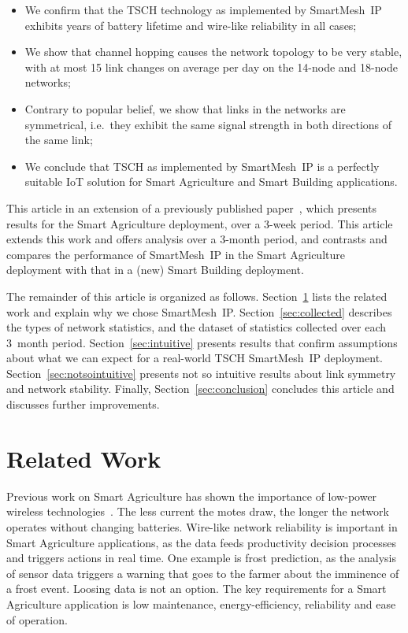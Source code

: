 \documentclass{elsarticle}
\newcommand{\smip}                {SmartMesh~IP\xspace}
\newcommand{\building}            {Smart Building\xspace}
\newcommand{\agri}                {Smart Agriculture\xspace}
\begin{document}
\begin{itemize}
    \item We confirm that the TSCH technology as implemented by \smip exhibits years of battery lifetime and wire-like reliability in all cases;
    \item We show that channel hopping causes the network topology to be very stable, with at most 15 link changes on average per day on the 14-node and 18-node networks;
    \item Contrary to popular belief, we show that links in the networks are symmetrical, i.e.~they exhibit the same signal strength in both directions of the same link;
    \item We conclude that TSCH as implemented by \smip is a perfectly suitable IoT solution for \agri and \building applications.
\end{itemize}


This article in an extension of a previously published paper~\cite{brun16intuitive}, which presents results for the \agri deployment, over a 3-week period.
This article extends this work and offers analysis over a 3-month period, and contrasts and compares the performance of \smip in the \agri deployment with that in a (new) \building deployment.


The remainder of this article is organized as follows.
Section~\ref{sec:related} lists the related work and explain why we chose \smip.
Section~\ref{sec:collected} describes the types of network statistics, and the dataset of statistics collected over each 3~month period.
Section~\ref{sec:intuitive} presents results that confirm assumptions about what we can expect for a real-world TSCH \smip deployment.
Section~\ref{sec:notsointuitive} presents not so intuitive results about link symmetry and network stability.
Finally, Section~\ref{sec:conclusion} concludes this article and discusses further improvements.

\section{Related Work}
\label{sec:related}


Previous work on \agri has shown the importance of low-power wireless technologies~\cite{ojha15wireless}.
The less current the motes draw, the longer the network operates without changing batteries.
Wire-like network reliability is important in \agri applications, as the data feeds productivity decision processes and triggers actions in real time.
One example is frost prediction, as the analysis of sensor data triggers a warning that goes to the farmer about the imminence of a frost event.
Loosing data is not an option.
The key requirements for a \agri application is low maintenance, energy-efficiency, reliability and ease of operation.
\end{document}
